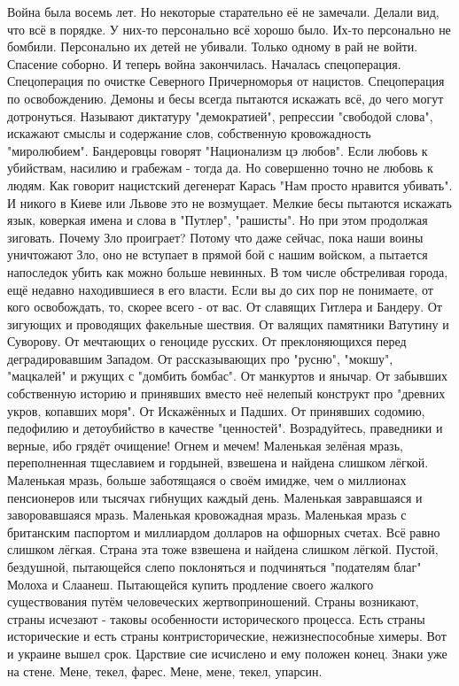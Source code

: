 Война была восемь лет. Но некоторые старательно её не замечали. Делали вид, что всё в порядке. У них-то персонально всё хорошо было. Их-то персонально не бомбили. Персонально их детей не убивали.
Только одному в рай не войти. Спасение соборно.
И теперь война закончилась. Началась спецоперация.
Спецоперация по очистке Северного Причерноморья от нацистов.
Спецоперация по освобождению.
Демоны и бесы всегда пытаются искажать всё, до чего могут дотронуться. Называют диктатуру "демократией", репрессии "свободой слова", искажают смыслы и содержание слов, собственную кровожадность "миролюбием".
Бандеровцы говорят "Национализм цэ любов". Если любовь к убийствам, насилию и грабежам - тогда да. Но совершенно точно не любовь к людям.
Как говорит нацистский дегенерат Карась "Нам просто нравится убивать". И никого в Киеве или Львове это не возмущает.
Мелкие бесы пытаются искажать язык, коверкая имена и слова в "Путлер", "рашисты". Но при этом продолжая зиговать.
Почему Зло проиграет? Потому что даже сейчас, пока наши воины уничтожают Зло, оно не вступает в прямой бой с нашим войском, а пытается напоследок убить как можно больше невинных. В том числе обстреливая города, ещё недавно находившиеся в его власти.
Если вы до сих пор не понимаете, от кого освобождать, то, скорее всего - от вас.
От славящих Гитлера и Бандеру. От зигующих и проводящих факельные шествия. От валящих памятники Ватутину и Суворову. От мечтающих о геноциде русских. От преклоняющихся перед деградировавшим Западом. От рассказывающих про "русню", "мокшу", "мацкалей" и ржущих с "домбить бомбас".
От манкуртов и янычар. От забывших собственную историю и принявших вместо неё нелепый конструкт про "древних укров, копавших моря".
От Искажённых и Падших. От принявших содомию, педофилию и детоубийство в качестве "ценностей".
Возрадуйтесь, праведники и верные, ибо грядёт очищение! Огнем и мечем!
Маленькая зелёная мразь, переполненная тщеславием и гордыней, взвешена и найдена слишком лёгкой.
Маленькая мразь, больше заботящаяся о своём имидже, чем о миллионах пенсионеров или тысячах гибнущих каждый день.
Маленькая завравшаяся и заворовавшаяся мразь. Маленькая кровожадная мразь. Маленькая мразь с британским паспортом и миллиардом долларов на офшорных счетах.
Всё равно слишком лёгкая.
Страна эта тоже взвешена и найдена слишком лёгкой.
Пустой, бездушной, пытающейся слепо поклоняться и подчиняться "подателям благ" Молоха и Слаанеш. Пытающейся купить продление своего жалкого существования путём человеческих жертвоприношений.
Страны возникают, страны исчезают - таковы особенности исторического процесса. Есть страны исторические и есть страны контристорические, нежизнеспособные химеры.
Вот и украине вышел срок.
Царствие сие исчислено и ему положен конец.
Знаки уже на стене.
Мене, текел, фарес. Мене, мене, текел, упарсин.

